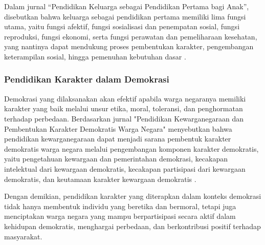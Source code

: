 Dalam jurnal “Pendidikan Keluarga sebagai Pendidikan Pertama bagi Anak”, disebutkan bahwa keluarga sebagai pendidikan pertama memiliki lima fungsi utama, yaitu fungsi afektif, fungsi sosialisasi dan penempatan sosial, fungsi reproduksi, fungsi ekonomi, serta fungsi perawatan dan pemeliharaan kesehatan, yang nantinya dapat mendukung proses pembentukan karakter, pengembangan keterampilan sosial, hingga pemenuhan kebutuhan dasar \cite{besari2022}.

\subsubsection{Pendidikan Karakter dalam Demokrasi}

Demokrasi yang dilaksanakan akan efektif apabila warga negaranya memiliki karakter yang baik melalui unsur etika, moral, toleransi, dan penghormatan terhadap perbedaan. Berdasarkan jurnal "Pendidikan Kewarganegaraan dan Pembentukan Karakter Demokratis Warga Negara" menyebutkan bahwa pendidikan kewarganegaraan dapat menjadi sarana pembentuk karakter demokratis warga negara melalui pengembangan komponen karakter demokratis, yaitu pengetahuan kewargaan dan pemerintahan demokrasi, kecakapan intelektual dari kewargaan demokratis, kecakapan partisipasi dari kewargaan demokratis, dan keutamaan karakter kewargaan demokratis \cite{arif2014}.

Dengan demikian, pendidikan karakter yang diterapkan dalam konteks demokrasi tidak hanya membentuk individu yang beretika dan bermoral, tetapi juga menciptakan warga negara yang mampu berpartisipasi secara aktif dalam kehidupan demokratis, menghargai perbedaan, dan berkontribusi positif terhadap masyarakat.